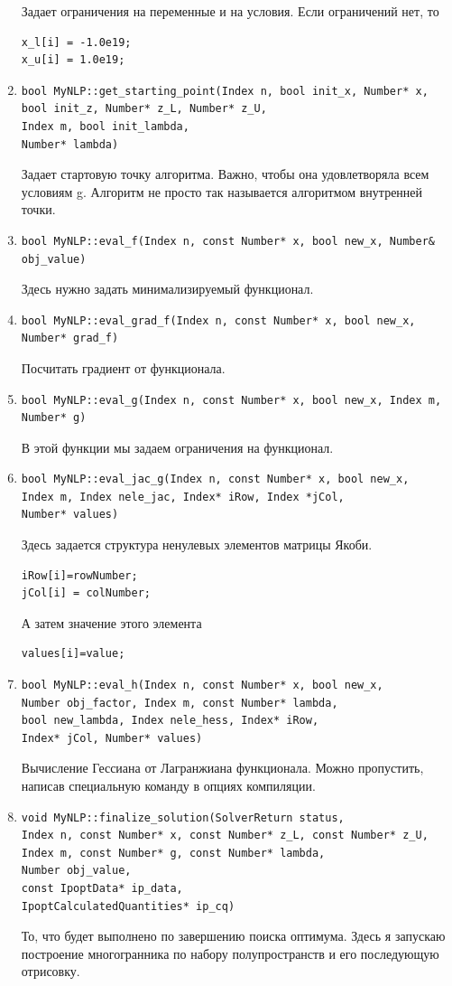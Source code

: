 \documentclass[14pt,fleqn,a4paper]{scrartcl}
\begin{document}
\begin{enumerate}
Задает ограничения на переменные и на условия. Если ограничений нет, то
\begin{verbatim} 
x_l[i] = -1.0e19;
x_u[i] = 1.0e19;
\end{verbatim}
\item 
\begin{verbatim}
bool MyNLP::get_starting_point(Index n, bool init_x, Number* x,
bool init_z, Number* z_L, Number* z_U,
Index m, bool init_lambda,
Number* lambda)
\end{verbatim}
Задает стартовую точку алгоритма. Важно, чтобы она удовлетворяла всем условиям g. Алгоритм не просто так называется алгоритмом внутренней точки. 
\item 
\begin{verbatim}
bool MyNLP::eval_f(Index n, const Number* x, bool new_x, Number& obj_value)
\end{verbatim}
Здесь нужно задать минимализируемый функционал. 
\item 
\begin{verbatim}
bool MyNLP::eval_grad_f(Index n, const Number* x, bool new_x, Number* grad_f)
\end{verbatim}
Посчитать градиент от функционала. 
\item
\begin{verbatim}
bool MyNLP::eval_g(Index n, const Number* x, bool new_x, Index m, Number* g)
\end{verbatim}
В этой функции мы задаем ограничения на функционал. 
\item
\begin{verbatim}
bool MyNLP::eval_jac_g(Index n, const Number* x, bool new_x,
Index m, Index nele_jac, Index* iRow, Index *jCol,
Number* values)
\end{verbatim}
Здесь задается структура ненулевых элементов матрицы Якоби. 
\begin{verbatim}
iRow[i]=rowNumber;
jCol[i] = colNumber;
\end{verbatim}
А затем значение этого элемента 
\begin{verbatim}
values[i]=value;
\end{verbatim}
\item
\begin{verbatim}
bool MyNLP::eval_h(Index n, const Number* x, bool new_x,
Number obj_factor, Index m, const Number* lambda,
bool new_lambda, Index nele_hess, Index* iRow,
Index* jCol, Number* values)
\end{verbatim}
Вычисление Гессиана от Лагранжиана функционала. Можно пропустить, написав специальную команду в опциях компиляции. 
\item
\begin{verbatim}
void MyNLP::finalize_solution(SolverReturn status,
Index n, const Number* x, const Number* z_L, const Number* z_U,
Index m, const Number* g, const Number* lambda,
Number obj_value,
const IpoptData* ip_data,
IpoptCalculatedQuantities* ip_cq)
\end{verbatim}
То, что будет выполнено по завершению поиска оптимума. Здесь я запускаю построение многогранника по набору полупространств и его последующую отрисовку.
\end{enumerate}
\end{document}
